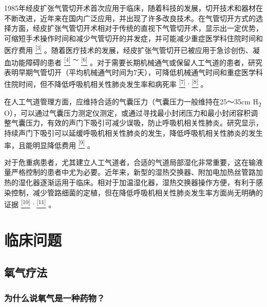 1985年经皮扩张气管切开术首次应用于临床，随着科技的发展，切开技术和器材在不断改进，近年来在国内广泛应用，并出现了许多改良技术。在气管切开方式的选择方面，经皮扩张气管切开术相对于传统的直视下气管切开术，显示出一定优势，可缩短手术操作时间和减少气管切开的并发症，并可能减少重症医学科住院时间和医疗费用
\protect\hyperlink{text00015.htmlux5cux23ch3-14}{\textsuperscript{{[}3{]}}}
。随着医疗技术的发展，经皮扩张气管切开已被应用于急诊创伤、凝血功能障碍的患者
\protect\hyperlink{text00015.htmlux5cux23ch4-14}{\textsuperscript{{[}4{]}}}
\textsuperscript{～}
\protect\hyperlink{text00015.htmlux5cux23ch6-14}{\textsuperscript{{[}6{]}}}
。对于需要长期机械通气或保留人工气道的患者，研究表明早期气管切开（平均机械通气时间为7天），可降低机械通气时间和重症医学科住院时间，但不降低呼吸机相关性肺炎发生率和病死率
\protect\hyperlink{text00015.htmlux5cux23ch7-14}{\textsuperscript{{[}7{]}}}
\textsuperscript{,}
\protect\hyperlink{text00015.htmlux5cux23ch8-14}{\textsuperscript{{[}8{]}}}
。

在人工气道管理方面，应维持合适的气囊压力（气囊压力一般维持在25～35cm
H\textsubscript{2}
O），可以通过气囊压力测定仪测定，或通过寻找最小封闭压力和最小封闭容积调整气囊压力，有效的声门下吸引可减少误吸，防止呼吸机相关性肺炎。研究显示，持续声门下吸引可以延缓呼吸机相关性肺炎的发生，降低呼吸机相关性肺炎的发生率，且能明显降低费用
\protect\hyperlink{text00015.htmlux5cux23ch9-14}{\textsuperscript{{[}9{]}}}
。

对于危重病患者，尤其建立人工气道者，合适的气道局部湿化非常重要，这在输液量严格控制的患者中尤为必要。近年来，新型的湿热交换器、附加电加热丝管路加热的湿化器逐渐运用于临床。相对于加温湿化器，湿热交换器操作方便，有利于感染控制，减少管路细菌的定植，但在降低呼吸机相关性肺炎发生率方面尚无明确的证据
\protect\hyperlink{text00015.htmlux5cux23ch10-14}{\textsuperscript{{[}10{]}}}
\textsuperscript{,}
\protect\hyperlink{text00015.htmlux5cux23ch11-14}{\textsuperscript{{[}11{]}}}
。

\section{临床问题}

\subsection{氧气疗法}

\subsubsection{为什么说氧气是一种药物？}

